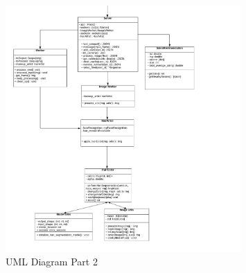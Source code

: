 \documentclass[12pt, titlepage]{article}
\begin{document}
\begin{center}
\begin{figure}[]
\includegraphics[width=0.8\textwidth, scale=1.5, keepaspectratio]{Design/SoftArchitecture/uml2.png}
\caption{UML Diagram Part 2}
\label{FigUH} 
\end{figure}
\end{center}



% 
\end{document}
